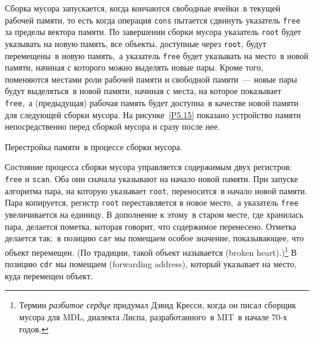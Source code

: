 Сборка мусора запускается, когда кончаются
свободные ячейки~в текущей рабочей памяти, то есть когда операция
{\tt cons} пытается сдвинуть указатель {\tt free} за
пределы вектора памяти.  По завершении сборки мусора
указатель {\tt root} будет указывать на новую память, все
объекты, доступные через {\tt root}, будут перемещены~в новую
память,~а указатель {\tt free} будет указывать на место~в новой
памяти, начиная с которого можно выделять новые пары.  Кроме того,
поменяются местами роли рабочей памяти и свободной памяти~---
новые пары будут выделяться~в новой памяти, начиная с места, на которое
показывает {\tt free},~а (предыдущая) рабочая память будет
доступна~в качестве новой памяти для следующей сборки мусора. На
рисунке~\ref{P5.15} показано устройство памяти
непосредственно перед сборкой мусора и сразу после нее.


\begin{cntrfig}
%



%
\caption{Перестройка памяти~в процессе сборки мусора.}
\label{P5.15}
\end{cntrfig}

Состояние процесса сборки мусора управляется содержимым
двух регистров: {\tt free} 
и {\tt scan}.  Оба они
сначала указывают на начало новой памяти.  При запуске алгоритма пара, на
которую указывает {\tt root}, переносится~в начало новой
памяти. Пара копируется, регистр {\tt root} переставляется в
новое место,~а указатель {\tt free} увеличивается на единицу.
В дополнение к этому~в старом месте, где хранилась пара, делается
пометка, которая говорит, что содержимое перенесено.  Отметка
делается так:~в позицию {\tt car} мы помещаем особое значение,
показывающее, что объект перемещен. (По традиции, такой объект
называется  (broken heart).)\footnote{Термин {\em разбитое сердце} придумал Дэвид
Кресси,
когда он писал сборщик мусора для  
MDL, диалекта Лиспа,
разработанного~в MIT~в начале 70-х годов.
}
В позицию {\tt cdr} мы помещаем  (forwarding address), который указывает на место, куда перемещен объект.

